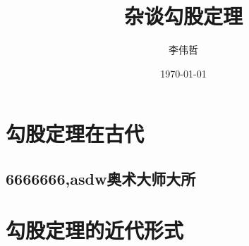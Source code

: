 \documentclass[UTF8]{ctexart}
\title{杂谈勾股定理}
\author{李伟哲}
\date{\today}
\begin{document}

    \maketitle  %
    \tableofcontents    %
    \section{勾股定理在古代}
    \subsection{6666666,asdw奥术大师大所}
    \section{勾股定理的近代形式}
    
\end{document}
